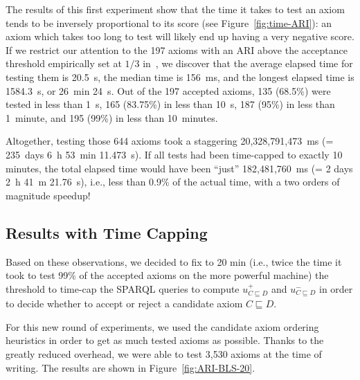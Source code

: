 \documentclass[conference]{IEEEtran}
\begin{document}
The results of this first experiment
show that the time it takes to test an axiom tends to be inversely proportional
to its score (see Figure~\ref{fig:time-ARI}): an axiom which takes
too long to test will likely end up having a very negative score.
If we restrict our attention to the 197 axioms with an ARI above the
acceptance threshold empirically set at $1/3$ in~\cite{TettamanziFaronZuckerGandon2014ekaw},
we discover that the average elapsed time for testing them is 20.5~s,
the median time is 156~ms, and the longest elapsed time is 1584.3~s, or 26~min 24~s.
Out of the 197 accepted axioms,
135 (68.5\%) were tested in less than 1~s,
165 (83.75\%) in less than 10~s,
187 (95\%) in less than 1~minute,
and 195 (99\%) in less than 10~minutes.

Altogether, testing those 644 axioms took a staggering 20,328,791,473~ms (= 235~days 6~h 53~min 11.473~s).
If all tests had been time-capped to exactly 10 minutes, the total elapsed time
would have been ``just'' 182,481,760~ms (= 2 days 2~h 41~m 21.76~s),
i.e., less than 0.9\% of the actual time, with a two orders of magnitude speedup!





\subsection{Results with Time Capping}

Based on these observations, we decided to fix to 20 min
(i.e., twice the time it took to test 99\% of the accepted axioms on the more powerful machine)
the threshold to time-cap the SPARQL queries to compute $u^+_{C \sqsubseteq D}$ and $u^-_{C \sqsubseteq D}$
in order to decide whether to accept or reject a candidate axiom $C \sqsubseteq D$.

For this new round of experiments, we used the candidate axiom ordering heuristics
in order to get as much tested axioms as possible.
Thanks to the greatly reduced overhead, %
we were able to test 3,530 axioms at the time of writing.
The results are shown in Figure~\ref{fig:ARI-BLS-20}.
\end{document}
